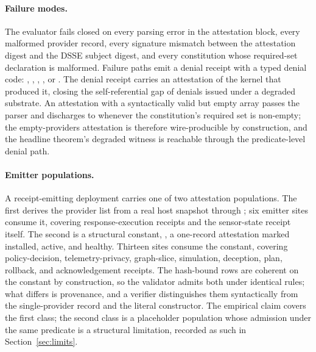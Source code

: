 \paragraph{Failure modes.}
The evaluator fails closed on every parsing error in the attestation block, every malformed provider record, every signature mismatch between the attestation digest and the DSSE subject digest, and every constitution whose required-set declaration is malformed. Failure paths emit a denial receipt with a typed denial code: , , , , or . The denial receipt carries an attestation of the kernel that produced it, closing the self-referential gap of denials issued under a degraded substrate. An attestation with a syntactically valid but empty  array passes the parser and discharges to  whenever the constitution's required set is non-empty; the empty-providers attestation is therefore wire-producible by construction, and the headline theorem's degraded witness is reachable through the predicate-level denial path.

\paragraph{Emitter populations.}
A receipt-emitting deployment carries one of two attestation populations. The first derives the provider list from a real host snapshot through ; six emitter sites consume it, covering response-execution receipts and the sensor-state receipt itself. The second is a structural constant, , a one-record attestation marked installed, active, and healthy. Thirteen sites consume the constant, covering policy-decision, telemetry-privacy, graph-slice, simulation, deception, plan, rollback, and acknowledgement receipts. The hash-bound rows are coherent on the constant by construction, so the validator admits both under identical rules; what differs is provenance, and a verifier distinguishes them syntactically from the single-provider record and the literal constructor. The empirical claim covers the first class; the second class is a placeholder population whose admission under the same predicate is a structural limitation, recorded as such in Section~\ref{sec:limits}.

